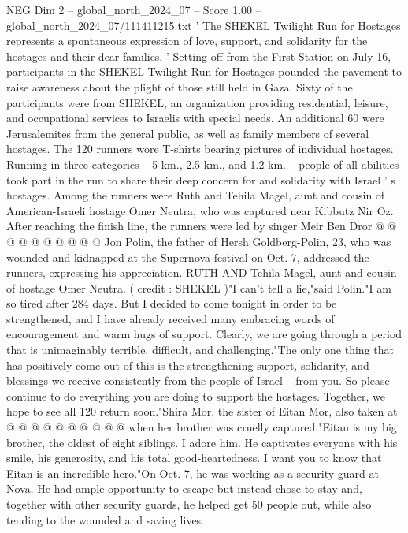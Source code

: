 \begin{textsample}{NEG Dim 2 – global\_north\_2024\_07 – Score 1.00 – global\_north\_2024\_07/111411215.txt}  \label{ex:f2_neg_063}
' The SHEKEL Twilight Run for Hostages represents a spontaneous expression of love, support, and solidarity for the hostages and their dear families. ' Setting off from the First Station on July 16, participants in the SHEKEL Twilight Run for Hostages pounded the pavement to raise awareness about the plight of those still held in Gaza.
Sixty of the participants were from SHEKEL, an organization providing residential, leisure, and occupational services to Israelis with special needs.
An additional 60 were Jerusalemites from the general public, as well as family members of several hostages.
The 120 runners wore T-shirts bearing pictures of individual hostages.
Running in three categories -- 5 km., 2.5 km., and 1.2 km. -- people of all abilities took part in the run to share their deep concern for and solidarity with Israel ' s hostages.
Among the runners were Ruth and Tehila Magel, aunt and cousin of American-Israeli hostage Omer Neutra, who was captured near Kibbutz Nir Oz.
After reaching the finish line, the runners were led by singer Meir Ben Dror @ @ @ @ @ @ @ @ @ @ Jon Polin, the father of Hersh Goldberg-Polin, 23, who was wounded and kidnapped at the Supernova festival on Oct. 7, addressed the runners, expressing his appreciation.
RUTH AND Tehila Magel, aunt and cousin of hostage Omer Neutra. ( credit : SHEKEL )"I can't tell a lie,"said Polin."I am so tired after 284 days.
But I decided to come tonight in order to be strengthened, and I have already received many embracing words of encouragement and warm hugs of support.
Clearly, we are going through a period that is unimaginably terrible, difficult, and challenging."The only one thing that has positively come out of this is the strengthening support, solidarity, and blessings we receive consistently from the people of Israel -- from you.
So please continue to do everything you are doing to support the hostages.
Together, we hope to see all 120 return soon."Shira Mor, the sister of Eitan Mor, also taken at @ @ @ @ @ @ @ @ @ @ when her brother was cruelly captured."Eitan is my big brother, the oldest of eight siblings.
I adore him.
He captivates everyone with his smile, his generosity, and his total good-heartedness.
I want you to know that Eitan is an incredible hero."On Oct. 7, he was working as a security guard at Nova.
He had ample opportunity to escape but instead chose to stay and, together with other security guards, he helped get 50 people out, while also tending to the wounded and saving lives.

\end{textsample}
